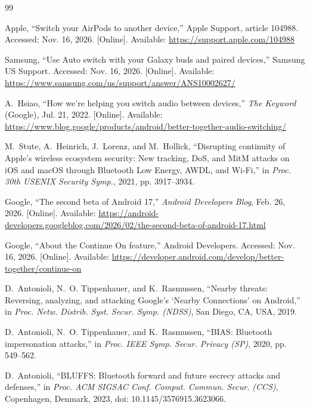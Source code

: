 \documentclass[conference]{IEEEtran}
\begin{document}
\begin{thebibliography}{99}

Apple, ``Switch your AirPods to another device,'' Apple Support, article 104988. Accessed: Nov. 16, 2026. [Online]. Available: \url{https://support.apple.com/104988}

Samsung, ``Use Auto switch with your Galaxy buds and paired devices,'' Samsung US Support. Accessed: Nov. 16, 2026. [Online]. Available: \url{https://www.samsung.com/us/support/answer/ANS10002627/}

A.~Hsiao, ``How we're helping you switch audio between devices,'' \emph{The Keyword} (Google), Jul. 21, 2022. [Online]. Available: \url{https://www.blog.google/products/android/better-together-audio-switching/}

M.~Stute, A.~Heinrich, J.~Lorenz, and M.~Hollick, ``Disrupting continuity of Apple's wireless ecosystem security: New tracking, DoS, and MitM attacks on iOS and macOS through Bluetooth Low Energy, AWDL, and Wi-Fi,'' in \emph{Proc. 30th USENIX Security Symp.}, 2021, pp. 3917--3934.

Google, ``The second beta of Android 17,'' \emph{Android Developers Blog}, Feb. 26, 2026. [Online]. Available: \url{https://android-developers.googleblog.com/2026/02/the-second-beta-of-android-17.html}

Google, ``About the Continue On feature,'' Android Developers. Accessed: Nov. 16, 2026. [Online]. Available: \url{https://developer.android.com/develop/better-together/continue-on}

D.~Antonioli, N.~O. Tippenhauer, and K.~Rasmussen, ``Nearby threats: Reversing, analyzing, and attacking Google's `Nearby Connections' on Android,'' in \emph{Proc. Netw. Distrib. Syst. Secur. Symp. (NDSS)}, San Diego, CA, USA, 2019.

D.~Antonioli, N.~O. Tippenhauer, and K.~Rasmussen, ``BIAS: Bluetooth impersonation attacks,'' in \emph{Proc. IEEE Symp. Secur. Privacy (SP)}, 2020, pp. 549--562.

D.~Antonioli, ``BLUFFS: Bluetooth forward and future secrecy attacks and defenses,'' in \emph{Proc. ACM SIGSAC Conf. Comput. Commun. Secur. (CCS)}, Copenhagen, Denmark, 2023, doi: 10.1145/3576915.3623066.


\end{thebibliography}
\end{document}
